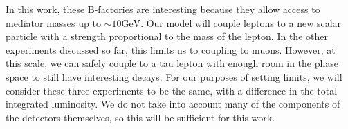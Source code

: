 In this work, these B-factories are interesting because they allow access to mediator masses up to $\sim 10\textrm{GeV}$.
Our model will couple leptons to a new scalar particle with a strength proportional to the mass of the lepton.
In the other experiments discussed so far, this limits us to coupling to muons.
However, at this scale, we can safely couple to a tau lepton with enough room in the phase space to still have interesting decays.
For our purposes of setting limits, we will consider these three experiments to be the same, with a difference in the total integrated luminosity.
We do not take into account many of the components of the detectors themselves, so this will be sufficient for this work.
